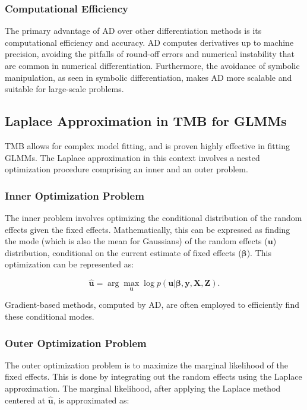 \documentclass[12pt, twoside,hidelinks]{article}
\theoremstyle{definition}
\numberwithin{equation}{section}
\begin{document}
\subsubsection{Computational Efficiency}\label{sec:rpack:AD:efficiency}
The primary advantage of AD over other differentiation methods is its computational efficiency and accuracy. AD computes derivatives up to machine precision, avoiding the pitfalls of round-off errors and numerical instability that are common in numerical differentiation. Furthermore, the avoidance of symbolic manipulation, as seen in symbolic differentiation, makes AD more scalable and suitable for large-scale problems.


\subsection{Laplace Approximation in TMB for GLMMs}\label{sec:rpack:Laplace}
TMB allows for complex model fitting, and is proven highly effective in fitting GLMMs. The Laplace approximation in this context involves a nested optimization procedure comprising an inner and an outer problem.

\subsubsection{Inner Optimization Problem}\label{sec:rpack:Laplace:inner}
The inner problem involves optimizing the conditional distribution of the random effects given the fixed effects. Mathematically, this can be expressed as finding the mode (which is also the mean for Gaussians) of the random effects (\(\boldsymbol{u}\)) distribution, conditional on the current estimate of fixed effects (\(\boldsymbol{\beta}\)). This optimization can be represented as:

\begin{equation}
    \hat{\boldsymbol{u}} = \arg \max_{\boldsymbol{u}} \log p(\boldsymbol{u} | \boldsymbol{\beta}, \boldsymbol{y}, \mathbf{X}, \mathbf{Z}).
\end{equation}

Gradient-based methods, computed by AD, are often employed to efficiently find these conditional modes.

\subsubsection{Outer Optimization Problem}\label{sec:rpack:Laplace:outer}
The outer optimization problem is to maximize the marginal likelihood of the fixed effects. This is done by integrating out the random effects using the Laplace approximation. The marginal likelihood, after applying the Laplace method centered at \(\hat{\boldsymbol{u}}\), is approximated as:
\end{document}
